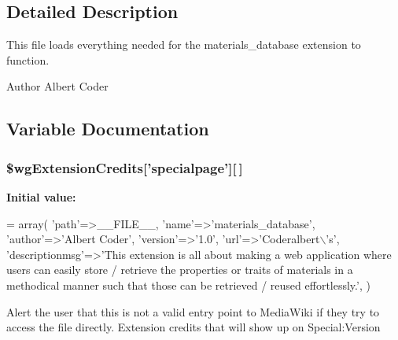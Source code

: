 \subsection{Detailed Description}
This file loads everything needed for the materials\+\_\+database extension to function.

\begin{DoxyAuthor}{Author}
Albert Coder 
\end{DoxyAuthor}


\subsection{Variable Documentation}
\hypertarget{materials__database_8php_a17b21c352c2b5481bd263dff39aba23e}{
\subsubsection[{\$wg\+Extension\+Credits}]{\setlength{\rightskip}{0pt plus 5cm}\$wg\+Extension\+Credits\mbox{[}'specialpage'\mbox{]}\mbox{[}$\,$\mbox{]}}}\label{materials__database_8php_a17b21c352c2b5481bd263dff39aba23e}
{\bfseries Initial value\+:}
\begin{DoxyCode}
= array(
    \textcolor{stringliteral}{'path'}=>\_\_FILE\_\_,
    \textcolor{stringliteral}{'name'}=>\textcolor{stringliteral}{'materials\_database'},
    \textcolor{stringliteral}{'author'}=>\textcolor{stringliteral}{'Albert Coder'},
    \textcolor{stringliteral}{'version'}=>\textcolor{stringliteral}{'1.0'},
    \textcolor{stringliteral}{'url'}=>\textcolor{stringliteral}{'Coderalbert\(\backslash\)'s'},
    \textcolor{stringliteral}{'descriptionmsg'}=>\textcolor{stringliteral}{'This extension is all about making a web application where users can easily store /
       retrieve the properties or traits of materials in a methodical manner such that those can be retrieved /
       reused  effortlessly.'},
)
\end{DoxyCode}
Alert the user that this is not a valid entry point to Media\+Wiki if they try to access the file directly. Extension credits that will show up on Special\+:Version 